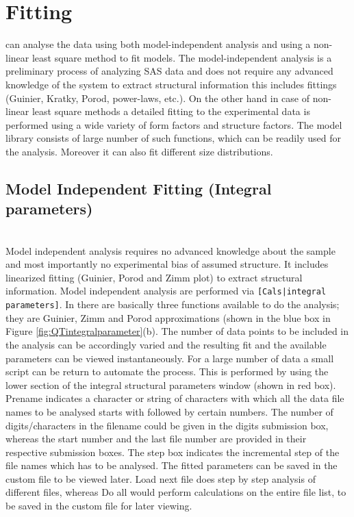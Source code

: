 \section{Fitting}
\SASfit can analyse the data using both model-independent analysis
and using a non-linear least square method to fit models. The
model-independent analysis is a preliminary process of analyzing SAS
data and does not require any advanced knowledge of the system to
extract structural information this includes fittings (Guinier,
Kratky, Porod, power-laws, etc.). On the other hand in case of
non-linear least square methods a detailed fitting to the
experimental data is performed using a wide variety of form factors
and structure factors. The \SASfit model library consists of large
number of such functions, which can be readily used for the
analysis. Moreover it can also fit different size distributions.

\subsection{Model Independent Fitting (Integral parameters)} ~\\
Model independent analysis requires no advanced knowledge about the
sample and most importantly no experimental bias of assumed
structure. It includes linearized fitting (Guinier, Porod and Zimm
plot) to extract structural information. Model independent analysis
are performed via \verb"[Cals|integral parameters]". In \SASfit
there are basically three functions available to do the analysis;
they are Guinier, Zimm and Porod approximations (shown in the blue
box in Figure \ref{fig:QTintegralparameter}(b). The number of data points to be included in the
analysis can be accordingly varied and the resulting fit and the
available parameters can be viewed instantaneously. For a large
number of data a small script can be return to automate the process.
This is performed by using the lower section of the integral
structural parameters window (shown in red box). Prename indicates a
character or string of characters with which all the data file names
to be analysed starts with followed by certain numbers. The number
of digits/characters in the filename could be given in the digits
submission box, whereas the start number and the last file number
are provided in their respective submission boxes. The step box
indicates the incremental step of the file names which has to be
analysed. The fitted parameters can be saved in the custom file to
be viewed later. Load next file does step by step analysis of
different files, whereas Do all would perform calculations on the
entire file list, to be saved in the custom file for later viewing.


